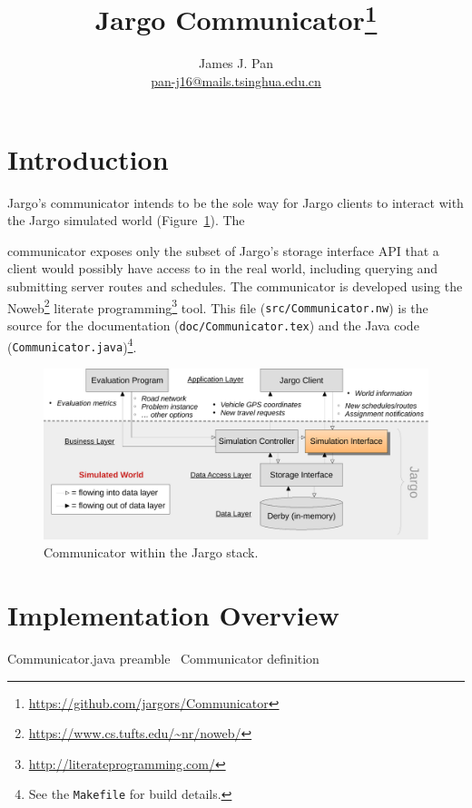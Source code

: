 \documentclass{article}
\title{Jargo Communicator\footnote{
  \url{https://github.com/jargors/Communicator}}}
\author{James J. Pan\\
  \small{\href{mailto:pan-j16@mails.tsinghua.edu.cn}{pan-j16@mails.tsinghua.edu.cn}}}
\def\nwendcode{\endtrivlist \endgroup}      %
\let\nwdocspar=\par
\begin{document}
\maketitle
\pagestyle{noweb}

\tableofcontents

\section{Introduction}
\label{sec:introduction}
Jargo's communicator intends to be the sole way for Jargo clients to interact
with the Jargo simulated world (Figure~\ref{fig:interface-fig}). The

communicator exposes only the subset of Jargo's storage interface API that a
client would possibly have access to in the real world, including querying and
submitting server routes and schedules.  The communicator is developed using
the Noweb\footnote{\url{https://www.cs.tufts.edu/~nr/noweb/}} literate
programming\footnote{\url{http://literateprogramming.com/}} tool.  This file
({\tt{}src/Communicator.nw}) is the source for the documentation
({\tt{}doc/Communicator.tex}) and the Java code
({\tt{}Communicator.java})\footnote{See the {\tt{}Makefile} for build details.}.

\begin{figure}[h]
\centering
\includegraphics[width=150mm]{src/fig/interface-fig}
\caption{Communicator within the Jargo stack.}
\label{fig:interface-fig}
\end{figure}

\section{Implementation Overview}
\label{sec:implementation-overview}
\endmoddef{}
\LA{}Communicator.java preamble~{\nwtagstyle{}}\RA{}
\LA{}\code{}Communicator\edoc{} definition~{\nwtagstyle{}}\RA{}
\nwendcode{}\nwdocspar
\end{document}
